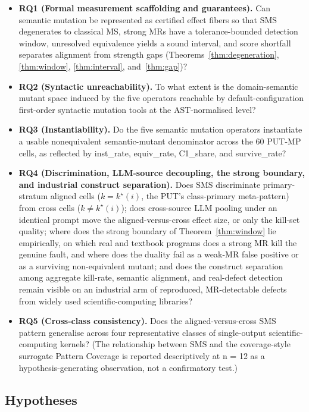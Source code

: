 \documentclass[manuscript,screen,review]{acmart}
\begin{document}
\begin{itemize}

\item
  \textbf{RQ1 (Formal measurement scaffolding and guarantees).} Can semantic
  mutation be represented as certified effect fibers so that SMS
  degenerates to classical MS, strong MRs have a tolerance-bounded
  detection window, unresolved equivalence yields a sound interval, and
  score shortfall separates alignment from strength gaps
  (Theorems~\ref{thm:degeneration}, \ref{thm:window},
  \ref{thm:interval}, and~\ref{thm:gap})?
\item
  \textbf{RQ2 (Syntactic unreachability).} To what extent is the
  domain-semantic mutant space induced by the five operators reachable
  by default-configuration first-order syntactic mutation tools at the
  AST-normalised level?
\item
  \textbf{RQ3 (Instantiability).} Do the five semantic mutation
  operators instantiate a usable nonequivalent semantic-mutant
  denominator across the 60 PUT-MP cells, as reflected by
  inst\_rate, equiv\_rate, C1\_share, and survive\_rate?
\item
  \textbf{RQ4 (Discrimination, LLM-source decoupling, the strong
  boundary, and industrial construct separation).} Does SMS discriminate
  primary-stratum aligned cells ($k = k^\star(i)$, the PUT's
  class-primary meta-pattern) from
  cross cells ($k \neq k^\star(i)$); does cross-source LLM pooling under an
  identical prompt move the aligned-versus-cross effect size, or only the
  kill-set quality; where does the strong boundary of Theorem~\ref{thm:window}
  lie empirically, on which real and textbook programs does a strong
  MR kill the genuine fault, and where does the duality fail as a weak-MR
  false positive or as a surviving non-equivalent mutant; and does the
  construct separation among aggregate kill-rate, semantic alignment,
  and real-defect detection remain visible on an industrial arm of
  reproduced, MR-detectable defects from widely used
  scientific-computing libraries?
\item
  \textbf{RQ5 (Cross-class consistency).} Does the aligned-versus-cross
  SMS pattern generalise across four representative classes of
  single-output scientific-computing kernels? (The relationship between
  SMS and the coverage-style surrogate Pattern Coverage is reported
  descriptively at n = 12 as a hypothesis-generating observation, not a
  confirmatory test.)
\end{itemize}

\subsection{Hypotheses}\label{hypotheses}
\end{document}
